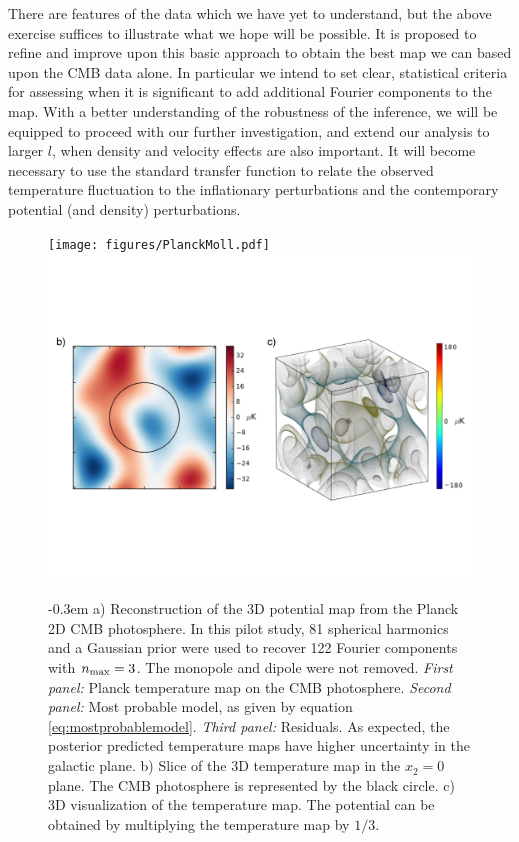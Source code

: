 \documentclass[psfig,12pt]{article}
\begin{document}
{There are
features of the data which we have yet to understand, but the above exercise suffices
to illustrate what we hope will be possible. It is proposed to refine
and improve upon this basic approach to obtain the best map we can
based upon the CMB data alone. In particular we intend to set clear,
statistical criteria for assessing when it is significant to add
additional Fourier components to the map. With a better understanding of
the robustness of the inference, we will be equipped to proceed with
our further investigation, and
extend our analysis to larger $l$, when density and velocity effects are also important. It will become necessary to use the standard transfer function to relate the observed temperature fluctuation to the inflationary perturbations and the contemporary potential (and density) perturbations.

\begin{figure}[t]
\vspace{-0.5cm}
\centering\texttt{[image: figures/PlanckMoll.pdf]}
\\
\centering\includegraphics[width=1.\linewidth]{figures/Planck3d.pdf}
\caption{
\openup -0.3em
{\footnotesize
a)  Reconstruction of the 3D potential map from the Planck 2D CMB photosphere.  In this pilot study, 81 spherical harmonics and a
Gaussian prior were used to recover 122 Fourier components with
$n_{\rm max}=3$. The monopole and dipole were not removed.
 {\it First panel: } Planck temperature map on the CMB photosphere. {\it Second panel: } Most probable model, as given by equation \ref{eq:mostprobablemodel}. {\it Third panel: } Residuals. As expected, the posterior predicted temperature maps have higher uncertainty in the galactic plane.
  b) Slice of the 3D temperature map in the
$x_2=0$ plane. The CMB photosphere is represented by the black circle.  c) 3D visualization of the temperature map. The potential can be obtained by multiplying the temperature map by $1/3$.
}}
\label{Fig:PlanckRec}
\end{figure}

}
\end{document}
